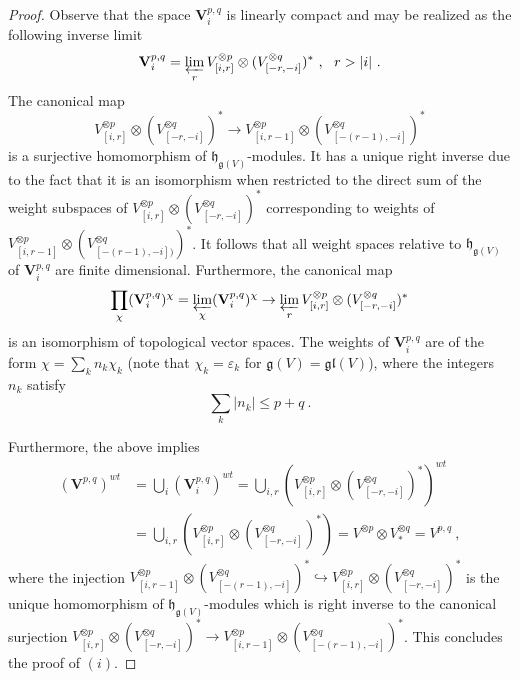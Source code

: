 \documentclass[12pt,reqno]{amsart}
\theoremstyle{definition}
\theoremstyle{remark}
\begin{document}
	\begin{proof} 
    Observe that the space $\mathbf{V}^{p,q}_{i}$ is linearly compact and may be realized as the following inverse limit
	    $$
	    \mathbf{V}^{p,q}_{i} = 
	    \varprojlim_r 	
     V_{[i, r]} ^{\otimes p}
     \otimes 
     (V_{[-r, -i]} ^{\otimes q})^* \ , \ \ r > |i|  \ .
	    $$
	    The canonical map 
	    $$
	    V_{[i, r]} ^{\otimes p}
     \otimes 
     (V_{[-r, -i]} ^{\otimes q})^*
     \rightarrow
     V_{[i, r-1]} ^{\otimes p}
     \otimes 
     (V_{[-(r-1), -i]} ^{\otimes q})^*
	    $$
	    is a surjective homomorphism of $\mathfrak{h}_{\mathfrak{g}(V)}$-modules. It has a unique right inverse due to the fact that it is an isomorphism when restricted to the direct sum of the weight subspaces of 
	    $V_{[i, r]} ^{\otimes p}
     \otimes 
     (V_{[-r, -i]} ^{\otimes q})^*$ 
     corresponding to weights of 
	    $V_{[i, r-1]} ^{\otimes p}
     \otimes 
     (V_{[-(r-1),-i])} ^{\otimes q})^*$. 
     It follows that all weight spaces relative to $\mathfrak{h}_{\mathfrak{g}(V)}$ of 
	    $\mathbf{V}^{p,q}_{i}$ are finite dimensional. Furthermore, the canonical map
	    $$
	    \prod_\chi (\mathbf{V}^{p,q}_{i})^\chi =
	    \varprojlim_\chi (\mathbf{V}^{p,q}_{i})^\chi
	    \rightarrow 
	    \varprojlim_r 
     V_{[i, r]} ^{\otimes p}
     \otimes 
     (V_{[-r, -i]} ^{\otimes q})^*
	    $$
	    	is an isomorphism of topological vector spaces. The weights of 
	$\mathbf{V}^{p,q}_{i}$ are of the form $\chi = \sum_{k}n_k \chi_k$ (note that $\chi_k = \varepsilon_k$ for $\mathfrak{g}(V) = \mathfrak{gl}(V)$), 
 where the integers $n_k$ satisfy
\[
\sum_{k}|n_k | \leq p+q \ .
\]
 
     
     
 
	Furthermore, the above implies
	\begin{equation*}
	    \begin{split}
	    (\mathbf{V}^{p,q})^{wt} & = \bigcup_{i} (\mathbf{V}^{p,q}_{i})^{wt} =
	\bigcup_{i,r} (V_{[i, r]} ^{\otimes p}
     \otimes 
     (V_{[-r, -i]} ^{\otimes q})^*)^{wt} \\
	& = 
	\bigcup_{i, r} (V_{[i, r]} ^{\otimes p}
     \otimes 
     (V_{[-r, -i]} ^{\otimes q})^*) 
	=  V ^{\otimes p}\otimes V_\ast^{\otimes q} = {V}^{p,q} \ ,
	\end{split}
	\end{equation*}
		where the injection 
	$V_{[i, r-1]} ^{\otimes p}
     \otimes 
     (V_{[-(r-1), -i]} ^{\otimes q})^*
	\hookrightarrow
	V_{[i, r]} ^{\otimes p}
     \otimes 
     (V_{[-r, -i]} ^{\otimes q})^*$ is the unique homomorphism of $\mathfrak{h}_{\mathfrak{g}(V)}$-modules which is right inverse to the canonical surjection 
	$V_{[i, r]} ^{\otimes p}
     \otimes 
     (V_{[-r, -i]} ^{\otimes q})^*
	\rightarrow
	V_{[i, r-1]} ^{\otimes p}
     \otimes 
     (V_{[-(r-1), -i]} ^{\otimes q})^*$.
	This concludes the proof of $(i)$.
	

\end{proof}
\end{document}
